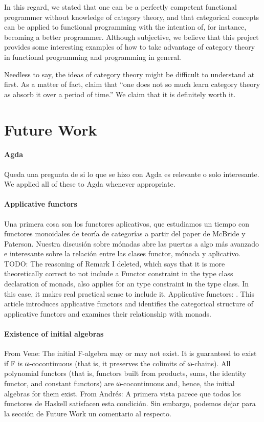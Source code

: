 In this regard, we stated that one can be a perfectly competent
functional programmer without knowledge of category theory, and that
categorical concepts can be applied to functional programming with the
intention of, for instance, becoming a better programmer. Although
subjective, we believe that this project provides some interesting
examples of how to take advantage of category theory in functional
programming and programming in general.

Needless to say, the ideas of category theory might be difficult to
understand at first. As a matter of fact,
\textcite[25]{bird-demoor-1997} claim that ``one does not so much
learn category theory as absorb it over a period of time.'' We claim
that it is definitely worth it.

\section{Future Work}

\paragraph{Agda}

Queda una pregunta de si lo que se hizo con Agda es relevante o solo
interesante. We applied all of these to Agda whenever appropriate.

\paragraph{Applicative functors}

Una primera cosa son los functores aplicativos, que estudiamos un
tiempo con functores monoidales de teoría de categorías a partir del
paper de McBride y Paterson. Nuestra discusión sobre mónadas abre las
puertas a algo más avanzado e interesante sobre la relación entre las
clases functor, mónada y aplicativo. TODO: The reasoning of Remark I
deleted, which says that it is more theoretically correct to not
include a Functor constraint in the type class declaration of monads,
also applies for an  type constraint in the
 type class. In this case, it makes real practical
sense to include it. Applicative functors:
\parencite{mcbride-paterson-2008}. This article introduces applicative
functors and identifies the categorical structure of applicative
functors and examines their relationship with monads.

\paragraph{Existence of initial algebras}

From Vene: The initial F-algebra may or may not exist. It is
guaranteed to exist if F is ω-cocontinuous (that is, it preserves the
colimits of ω-chains). All polynomial functors (that is, functors
built from products, sums, the identity functor, and constant
functors) are ω-cocontinuous and, hence, the initial algebras for them
exist. From Andrés: A primera vista parece que todos los functores de
Haskell satisfacen esta condición. Sin embargo, podemos dejar para la
sección de Future Work un comentario al respecto.

\clearemptydoublepage
